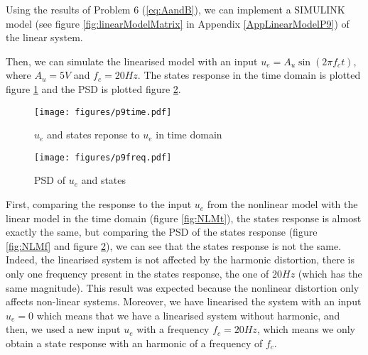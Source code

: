Using the results of Problem 6 (\ref{eq:AandB}), we can implement a SIMULINK model (see figure \ref{fig:linearModelMatrix} in Appendix \ref{AppLinearModelP9}) of the linear system.

Then, we can simulate the linearised model with an input $u_e=A_u\sin(2\pi f_ct)$, where $A_u=5V$ and $f_c=20Hz$. The states response in the time domain is plotted figure \ref{fig:responseLMt} and the PSD is plotted figure \ref{fig:responseLMf}.

\begin{figure}[H]
 \centering 
\texttt{[image: figures/p9time.pdf]}
\caption{$u_e$ and states reponse to $u_e$ in time domain}
\label{fig:responseLMt}
\end{figure}
\begin{figure}[H]
 \centering 
\texttt{[image: figures/p9freq.pdf]}
\caption{PSD of $u_e$ and states}
\label{fig:responseLMf}
\end{figure}

First, comparing the response to the input $u_e$ from the nonlinear model with the linear model in the time domain (figure \ref{fig:NLMt}), the states response is almost exactly the same, but comparing the PSD of the states response (figure \ref{fig:NLMf} and figure \ref{fig:responseLMf}), we can see that the states response is not the same. Indeed, the linearised system is not affected by the harmonic distortion, there is only one frequency present in the states response, the one of 20$Hz$ (which has the same magnitude).
This result was expected because the nonlinear distortion only affects non-linear systems. Moreover, we have linearised the system with an input $u_e=0$ which means that we have a linearised system without harmonic, and then, we used a new input $u_e$ with a frequency $f_c=20Hz$, which means we only obtain a state response with an harmonic of a frequency of $f_c$.





